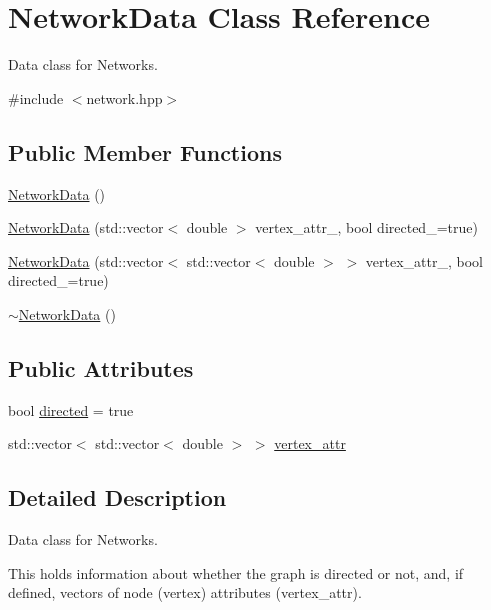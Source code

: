 \hypertarget{class_network_data}{}\section{Network\+Data Class Reference}
\label{class_network_data}


Data class for Networks.  




{\ttfamily \#include $<$network.\+hpp$>$}

\subsection*{Public Member Functions}
\begin{DoxyCompactItemize}
\item 
\hyperlink{class_network_data_af62a7dde71c52bc49bc1e0ddc27b4724}{Network\+Data} ()
\item 
\hyperlink{class_network_data_a431d2c3a6cf9f61437643b767821e4a5}{Network\+Data} (std\+::vector$<$ double $>$ vertex\+\_\+attr\+\_\+, bool directed\+\_\+=true)
\item 
\hyperlink{class_network_data_ac4b5a740d40bc84695653c3e3499ac65}{Network\+Data} (std\+::vector$<$ std\+::vector$<$ double $>$ $>$ vertex\+\_\+attr\+\_\+, bool directed\+\_\+=true)
\item 
\hyperlink{class_network_data_a4667137d76017d3c69a789ad6cf86931}{$\sim$\+Network\+Data} ()
\end{DoxyCompactItemize}
\subsection*{Public Attributes}
\begin{DoxyCompactItemize}
\item 
bool \hyperlink{class_network_data_a5e67b89f22ad1151680a5f4428c6c780}{directed} = true
\item 
std\+::vector$<$ std\+::vector$<$ double $>$ $>$ \hyperlink{class_network_data_a3dc3e5549abc6daa85f30dbdc504ecac}{vertex\+\_\+attr}
\end{DoxyCompactItemize}


\subsection{Detailed Description}
Data class for Networks. 

This holds information about whether the graph is directed or not, and, if defined, vectors of node (vertex) attributes ({\ttfamily vertex\+\_\+attr}). 

